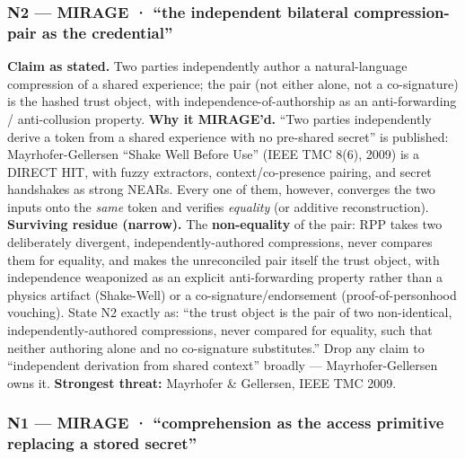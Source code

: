 \documentclass[
  11pt,
]{article}
\begin{document}
\subsubsection{N2 --- MIRAGE · ``the independent bilateral
compression-pair as the
credential''}\label{n2-mirage-the-independent-bilateral-compression-pair-as-the-credential}

\textbf{Claim as stated.} Two parties independently author a
natural-language compression of a shared experience; the pair (not
either alone, not a co-signature) is the hashed trust object, with
independence-of-authorship as an anti-forwarding / anti-collusion
property. \textbf{Why it MIRAGE'd.} ``Two parties independently derive a
token from a shared experience with no pre-shared secret'' is published:
Mayrhofer-Gellersen ``Shake Well Before Use'' (IEEE TMC 8(6), 2009) is a
DIRECT HIT, with fuzzy extractors, context/co-presence pairing, and
secret handshakes as strong NEARs. Every one of them, however, converges
the two inputs onto the \emph{same} token and verifies \emph{equality}
(or additive reconstruction). \textbf{Surviving residue (narrow).} The
\textbf{non-equality} of the pair: RPP takes two deliberately divergent,
independently-authored compressions, never compares them for equality,
and makes the unreconciled pair itself the trust object, with
independence weaponized as an explicit anti-forwarding property rather
than a physics artifact (Shake-Well) or a co-signature/endorsement
(proof-of-personhood vouching). State N2 exactly as: ``the trust object
is the pair of two non-identical, independently-authored compressions,
never compared for equality, such that neither authoring alone and no
co-signature substitutes.'' Drop any claim to ``independent derivation
from shared context'' broadly --- Mayrhofer-Gellersen owns it.
\textbf{Strongest threat:} Mayrhofer \& Gellersen, IEEE TMC 2009.

\subsubsection{N1 --- MIRAGE · ``comprehension as the access primitive
replacing a stored
secret''}\label{n1-mirage-comprehension-as-the-access-primitive-replacing-a-stored-secret}
\end{document}
